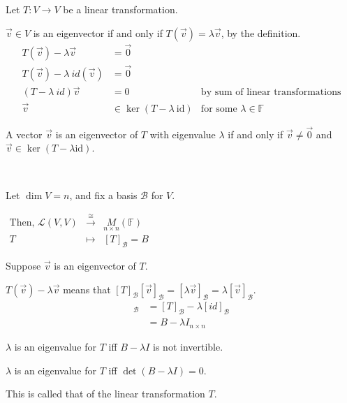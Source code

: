 \documentclass[11pt,fleqn]{book} %
\begin{document}
Let $T: V \to V$ be a linear transformation.

$\vec{v} \in V$  is an eigenvector if and only if $T(\vec{v}) = \lambda \vec{v}$, by the definition.
\begin{align*}
    T(\vec{v}) - \lambda \vec{v}
    &= \vec{0}
    \\
    T(\vec{v}) - \lambda ~ id(\vec{v})
    &= \vec{0}
    \\
    (T-\lambda ~ id)\vec{v}
    &= 0
    &\text{by sum of linear transformations}
    \\
    \vec{v} &\in \ker (T - \lambda ~ \mathrm{id}) &\text{for some }\lambda \in \mathbb{F}
\end{align*}

\setcounter{chapter}{4}
\setcounter{dummy}{4}
\begin{proposition}
    A vector $\vec{v}$ is an eigenvector of $T$ with eigenvalue $\lambda$ if and only if $\vec{v} \neq \vec{0}$ and $\vec{v} \in \ker(T - \lambda \mathrm{id})$.
\end{proposition}
\setcounter{chapter}{3}


\begin{example}
{~~~}

    Let $\dim V = n$, and fix a basis $\mathcal{B}$ for $V$.

    $\begin{matrix} \text{Then, } \mathcal{L}(V, V) &\overset{\cong}{\to} &\underset{n \times n}M(\mathbb{F}) \\ T &\mapsto &[T]_\mathcal{B} = B \end{matrix}$

    Suppose $\vec{v}$ is an eigenvector of $T$.

    $T(\vec{v}) - \lambda \vec{v}$ means that $[T]_\mathcal{B}[\vec{v}]_\mathcal{B} = [\lambda\vec{v}]_\mathcal{B} = \lambda [\vec{v}]_\mathcal{B}$.
    \begin{align*}
        [T - \lambda ~ id]_\mathcal{B}
        &= [T]_\mathcal{B} - \lambda[id]_\mathcal{B}
        \\
        &={B - \lambda I}_{n \times n}
    \end{align*}

    $\lambda$ is an eigenvalue for $T$ iff $B - \lambda I$ is not invertible.

    $\lambda$ is an eigenvalue for $T$ iff $\det (B - \lambda I) = 0$.

    This is called that  of the linear transformation $T$.
\end{example}
\end{document}
